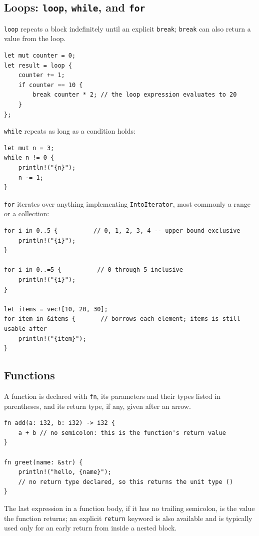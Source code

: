 \documentclass[11pt]{book}
\begin{document}
\subsection*{Loops: \texttt{loop}, \texttt{while}, and \texttt{for}}

\texttt{loop} repeats a block indefinitely until an explicit \texttt{break}; \texttt{break} can also return a value from the loop.

\begin{lstlisting}
let mut counter = 0;
let result = loop {
    counter += 1;
    if counter == 10 {
        break counter * 2; // the loop expression evaluates to 20
    }
};
\end{lstlisting}

\texttt{while} repeats as long as a condition holds:

\begin{lstlisting}
let mut n = 3;
while n != 0 {
    println!("{n}");
    n -= 1;
}
\end{lstlisting}

\texttt{for} iterates over anything implementing \texttt{IntoIterator}, most commonly a range or a collection:

\begin{lstlisting}
for i in 0..5 {          // 0, 1, 2, 3, 4 -- upper bound exclusive
    println!("{i}");
}

for i in 0..=5 {          // 0 through 5 inclusive
    println!("{i}");
}

let items = vec![10, 20, 30];
for item in &items {       // borrows each element; items is still usable after
    println!("{item}");
}
\end{lstlisting}

\subsection*{Functions}

A function is declared with \texttt{fn}, its parameters and their types listed in parentheses, and its return type, if any, given after an arrow.

\begin{lstlisting}
fn add(a: i32, b: i32) -> i32 {
    a + b // no semicolon: this is the function's return value
}

fn greet(name: &str) {
    println!("hello, {name}");
    // no return type declared, so this returns the unit type ()
}
\end{lstlisting}

The last expression in a function body, if it has no trailing semicolon, is the value the function returns; an explicit \texttt{return} keyword is also available and is typically used only for an early return from inside a nested block.
\end{document}
